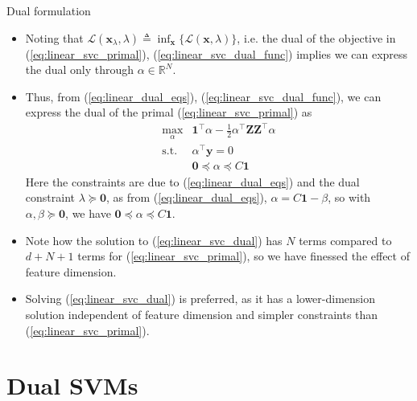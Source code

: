 \documentclass{beamer}
\numberwithin{equation}{section}
\newcommand{\aref}[1]{\alert{\ref{#1}}}
\begin{document}
\begin{frame}{Dual formulation}
    \begin{itemize}
        \item
        Noting that $ \mathcal{L}(\mathbf{x}_\lambda, \lambda) \triangleq
        \inf_\mathbf{x}\{\mathcal{L}(\mathbf{x}, \lambda)\} $, i.e. the dual
        of the objective in (\aref{eq:linear_svc_primal}),
        (\aref{eq:linear_svc_dual_func}) implies we can express the dual
        only through $ \alpha \in \mathbb{R}^N $.

        \item
        Thus, from (\aref{eq:linear_dual_eqs}),
        (\aref{eq:linear_svc_dual_func}), we can express the dual of the
        primal (\aref{eq:linear_svc_primal}) as
        \begin{equation} \label{eq:linear_svc_dual}
            \begin{array}{ll}
                \displaystyle\max_\alpha & \mathbf{1}^\top\alpha -
                \frac{1}{2}\alpha^\top\mathbf{ZZ}^\top\alpha \\
                \text{s.t.} & \alpha^\top\mathbf{y} = 0 \\
                & \mathbf{0} \preceq \alpha \preceq C\mathbf{1}
            \end{array}
        \end{equation}
        Here the constraints are due to (\aref{eq:linear_dual_eqs}) and the
        dual constraint $ \lambda \succeq \mathbf{0} $, as from
        (\aref{eq:linear_dual_eqs}), $ \alpha = C\mathbf{1} - \beta $, so
        with $ \alpha, \beta \succeq \mathbf{0} $, we have 
        $ \mathbf{0} \preceq \alpha \preceq C\mathbf{1} $.

        \item
        Note how the solution to (\aref{eq:linear_svc_dual}) has $ N $ terms
        compared to $ d + N + 1 $ terms for (\aref{eq:linear_svc_primal}), so
        we have finessed the effect of feature dimension.

        \item
        Solving (\aref{eq:linear_svc_dual}) is preferred, as it has a
        lower-dimension solution independent of feature dimension and
        simpler constraints than (\aref{eq:linear_svc_primal}).
    \end{itemize}
\end{frame}

\section{Dual SVMs}
\end{document}
